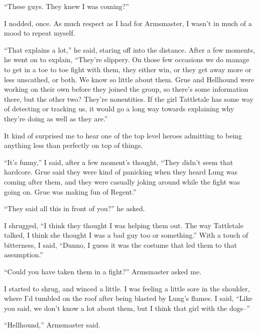 ``These guys.  They knew I was coming?''



I nodded, once.  As much respect as I had for Armsmaster, I wasn't in much of a mood to repeat myself.



``That explains a lot,'' he said, staring off into the distance.  After a few moments, he went on to explain, ``They're slippery.  On those few occasions we do manage to get in a toe to toe fight with them, they either win, or they get away more or less unscathed, or both.  We know so little about them.  Grue and Hellhound were working on their own before they joined the group, so there's some information there, but the other two?  They're nonentities.  If the girl Tattletale has some way of detecting or tracking us, it would go a long way towards explaining why they're doing as well as they are.''



It kind of surprised me to hear one of the top level heroes admitting to being anything less than perfectly on top of things.



``It's funny,'' I said, after a few moment's thought, ``They didn't seem that hardcore.  Grue said they were kind of panicking when they heard Lung was coming after them, and they were casually joking around while the fight was going on.  Grue was making fun of Regent.''



``They said all this in front of you?'' he asked.



I shrugged, ``I think they thought I was helping them out.  The way Tattletale talked, I think she thought I was a bad guy too or something.''  With a touch of bitterness, I said, ``Dunno, I guess it was the costume that led them to that assumption.''



``Could you have taken them in a fight?'' Armsmaster asked me.



I started to shrug, and winced a little.  I was feeling a little sore in the shoulder, where I'd tumbled on the roof after being blasted by Lung's flames.  I said, ``Like you said, we don't know a lot about them, but I think that girl with the dogs--''



``Hellhound,'' Armsmaster said.



